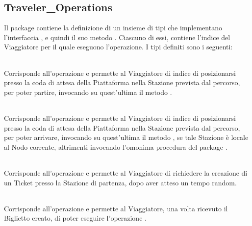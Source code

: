 	\subsection{Traveler\_Operations}
	
	Il package  contiene la definizione di un insieme di tipi  che implementano l'interfaccia , e quindi il suo metodo . Ciascuno di essi, contiene l'indice del Viaggiatore  per il quale eseguono l'operazione. I tipi definiti sono i seguenti:
	
	\begin{description}
		
		\item {}\\
		Corrisponde all'operazione  e permette al Viaggiatore di indice  di posizionarsi presso la coda di attesa della Piattaforma nella Stazione prevista dal percorso, per poter partire, invocando su quest'ultima il metodo . 
		
		\item {}\\
		Corrisponde all'operazione  e permette al Viaggiatore di indice  di posizionarsi presso la coda di attesa della Piattaforma nella Stazione prevista dal percorso, per poter arrivare, invocando su quest'ultima il metodo , se tale Stazione è locale al Nodo corrente, altrimenti invocando l'omonima procedura del package .
		
		\item {}\\
		Corrisponde all'operazione  e permette al Viaggiatore di richiedere la creazione di un Ticket presso la Stazione di partenza, dopo aver atteso un tempo random.
		
		\item {}\\
		Corrisponde all'operazione  e permette al Viaggiatore, una volta ricevuto il Biglietto creato, di poter eseguire l'operazione . 
		 
	\end{description}
	
	
